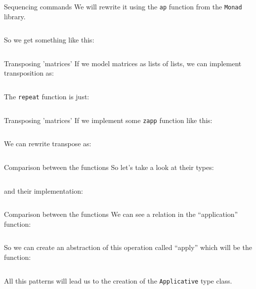 \documentclass[10pt]{beamer}
\begin{document}
\begin{frame}{Sequencing commands}
  We will rewrite it using the \verb~ap~ function from the
  \verb~Monad~ library.

  \inputminted{haskell}{../src/ap.hs}

  So we get something like this:

  \inputminted{haskell}{../src/sequence1.hs}
\end{frame}

\begin{frame}{Transposing 'matrices'}
  If we model matrices as lists of lists, we can implement
  transposition as:

  \inputminted{haskell}{../src/transpose.hs}

  The \verb~repeat~ function is just:

  \inputminted{haskell}{../src/repeat.hs}
\end{frame}

\begin{frame}{Transposing 'matrices'}
  If we implement some \verb~zapp~ function like this:

  \inputminted{haskell}{../src/zapp.hs}

  We can rewrite transpose as:

  \inputminted{haskell}{../src/transpose1.hs}
\end{frame}

\begin{frame}{Comparison between the functions}
  So let's take a look at their types:

  \inputminted{haskell}{../src/comparison_types.hs}

  and their implementation:

  \inputminted{haskell}{../src/comparison_impl.hs}
\end{frame}

\begin{frame}{Comparison between the functions}
  We can see a relation in the ``application'' function:

  \inputminted{haskell}{../src/comparison_types_ap.hs}

  So we can create an abstraction of this operation called ``apply''
  which will be the function:

  \inputminted{haskell}{../src/apply_type.hs}

  All this patterns will lead us to the creation of the
  \verb~Applicative~ type class.
\end{frame}
\end{document}
